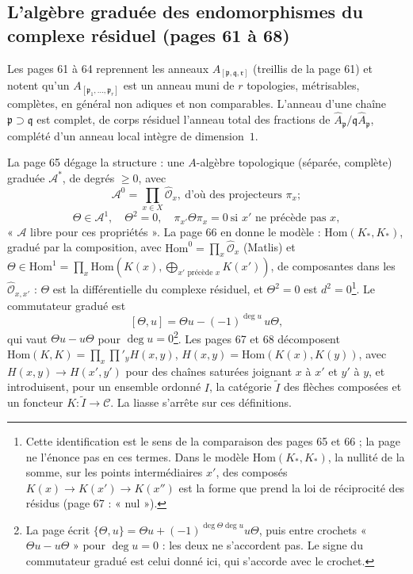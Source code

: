 \documentclass[11pt,a4paper]{article}
\begin{document}
\subsection*{L'algèbre graduée des endomorphismes du complexe résiduel (pages 61 à 68)}

Les pages 61 à 64 reprennent les anneaux $A_{[\mathfrak{p}, \mathfrak{q},
\mathfrak{r}]}$ (treillis de la page 61) et notent qu'un $A_{[\mathfrak{p}_1,
\ldots, \mathfrak{p}_r]}$ est un anneau muni de $r$ topologies, métrisables,
complètes, en général non adiques et non comparables. L'anneau d'une chaîne
$\mathfrak{p} \supset \mathfrak{q}$ est complet, de corps résiduel l'anneau total
des fractions de $\hat A_{\mathfrak{p}}/\mathfrak{q}\hat A_{\mathfrak{p}}$, complété
d'un anneau local intègre de dimension~$1$.

La page 65 dégage la structure : une $A$-algèbre topologique (séparée, complète)
graduée $\mathcal{A}^{*}$, de degrés $\geq 0$, avec
\[
\mathcal{A}^0 = \prod_{x \in X} \hat{\mathcal{O}}_x,\ \text{d'où des projecteurs }
\pi_x ;
\]
\[
\Theta \in \mathcal{A}^1,\quad \Theta^2 = 0,\quad
\pi_{x'}\Theta\pi_x = 0 \ \text{si } x' \text{ ne précède pas } x,
\]
« $\mathcal{A}$ libre pour ces propriétés ». La page 66 en donne le modèle :
$\mathrm{Hom}(K_*, K_*)$, gradué par la composition, avec
$\mathrm{Hom}^0 = \prod_x \hat{\mathcal{O}}_x$ (Matlis) et $\Theta \in \mathrm{Hom}^1
= \prod_x \mathrm{Hom}(K(x), \bigoplus_{x' \text{ précède } x} K(x'))$, de
composantes dans les $\hat{\mathcal{O}}_{x,x'}$ : $\Theta$ est la différentielle du
complexe résiduel, et $\Theta^2 = 0$ est $d^2 = 0$\footnote{Cette identification
est le sens de la comparaison des pages 65 et 66 ; la page ne l'énonce pas en ces
termes. Dans le modèle $\mathrm{Hom}(K_*, K_*)$, la nullité de la somme, sur les
points intermédiaires $x'$, des composés $K(x) \to K(x') \to K(x'')$ est la forme
que prend la loi de réciprocité des résidus (page 67 : « nul »).}. Le commutateur
gradué est
\[
[\Theta, u] = \Theta u - (-1)^{\deg u}\, u\Theta,
\]
qui vaut $\Theta u - u\Theta$ pour $\deg u = 0$\footnote{La page écrit $\{\Theta,
u\} = \Theta u + (-1)^{\deg\Theta\deg u} u\Theta$, puis entre crochets
« $\Theta u - u\Theta$ » pour $\deg u = 0$ : les deux ne s'accordent pas. Le signe
du commutateur gradué est celui donné ici, qui s'accorde avec le crochet.}. Les
pages 67 et 68 décomposent $\mathrm{Hom}(K, K) = \prod_x \prod'_y H(x,y)$, $H(x,y)
= \mathrm{Hom}(K(x), K(y))$, avec $H(x,y) \to H(x',y')$ pour des chaînes saturées
joignant $x$ à $x'$ et $y'$ à $y$, et introduisent, pour un ensemble ordonné $I$,
la catégorie $\tilde I$ des flèches composées et un foncteur $K : \tilde I \to
\mathcal{C}$. La liasse s'arrête sur ces définitions.
\end{document}
